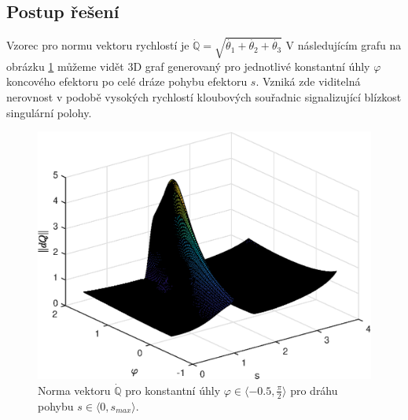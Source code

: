 \documentclass{article}
\begin{document}
		\subsection{Postup řešení}
			Vzorec pro normu vektoru rychlostí je ${\mathbb{\dot{Q}}} = \sqrt{\dot{\theta_1}+\dot{\theta_2}+\dot{\theta_3}}$ V následujícím grafu na obrázku \ref{pic:Norma_vekt_dQ} můžeme vidět 3D graf generovaný pro jednotlivé konstantní úhly \(\varphi\) koncového efektoru po celé dráze pohybu efektoru \(s\). Vzniká zde viditelná nerovnost v podobě vysokých rychlostí kloubových souřadnic signalizující blízkost singulární polohy.
				\begin{figure}[H]
					\centering
					\includegraphics[width=\textwidth]{./Graphics/6_Graphics/Norma_vekt_dQ_konst.eps}
					\caption{Norma vektoru ${\mathbb{\dot{Q}}}$ pro konstantní úhly \(\varphi \in \langle -0.5, \frac{\pi}{2} \rangle\) pro dráhu pohybu \(s \in \langle 0, s_{max}\rangle\).}
					\label{pic:Norma_vekt_dQ}
				\end{figure}
\end{document}
